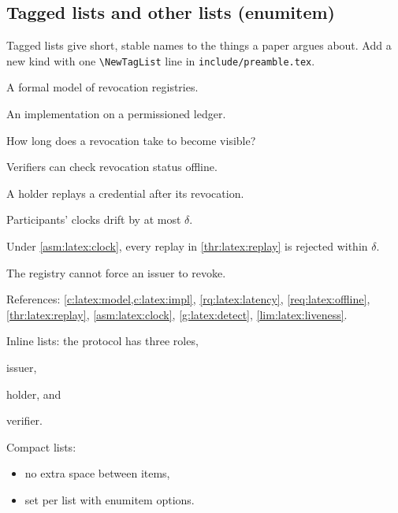 \subsection{Tagged lists and other lists (enumitem)}\label{app:latex:tags}
Tagged lists give short, stable names to the things a paper argues about.
Add a new kind with one \texttt{\textbackslash NewTagList} line in \texttt{include/preamble.tex}.
\begin{contributions}
  \item\label{c:latex:model} A formal model of revocation registries.
  \item\label{c:latex:impl} An implementation on a permissioned ledger.
\end{contributions}
\begin{rqlist}
  \item\label{rq:latex:latency} How long does a revocation take to become visible?
\end{rqlist}
\begin{requirements}
  \item\label{req:latex:offline} Verifiers can check revocation status offline.
\end{requirements}
\begin{threats}
  \item\label{thr:latex:replay} A holder replays a credential after its revocation.
\end{threats}
\begin{assumptions}
  \item\label{asm:latex:clock} Participants' clocks drift by at most $\delta$.
\end{assumptions}
\begin{guarantees}
  \item\label{g:latex:detect} Under \cref{asm:latex:clock}, every replay in \cref{thr:latex:replay} is rejected within $\delta$.
\end{guarantees}
\begin{limitations}
  \item\label{lim:latex:liveness} The registry cannot force an issuer to revoke.
\end{limitations}
References: \cref{c:latex:model,c:latex:impl}, \cref{rq:latex:latency}, \cref{req:latex:offline}, \cref{thr:latex:replay}, \cref{asm:latex:clock}, \cref{g:latex:detect}, \cref{lim:latex:liveness}.

Inline lists: the protocol has three roles, \begin{enumerate*}[label=(\roman*)] \item issuer, \item holder, and \item verifier. \end{enumerate*}
Compact lists:
\begin{itemize}[noitemsep]
  \item no extra space between items,
  \item set per list with enumitem options.
\end{itemize}

